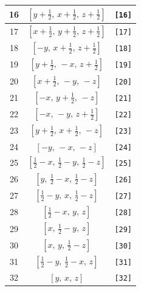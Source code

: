 \documentclass[fleqn,8pt]{jsarticle}
\begin{document}
\begin{longtable}{ccc}
16 & $\left[ y + \frac{1}{2},\, x + \frac{1}{2},\, z + \frac{1}{2} \right]$ & {\tt [16]} \\ \hline
17 & $\left[ x + \frac{1}{2},\, y + \frac{1}{2},\, z + \frac{1}{2} \right]$ & {\tt [17]} \\ \hline
18 & $\left[ - y,\, x + \frac{1}{2},\, z + \frac{1}{2} \right]$ & {\tt [18]} \\ \hline
19 & $\left[ y + \frac{1}{2},\, - x,\, z + \frac{1}{2} \right]$ & {\tt [19]} \\ \hline
20 & $\left[ x + \frac{1}{2},\, - y,\, - z \right]$ & {\tt [20]} \\ \hline
21 & $\left[ - x,\, y + \frac{1}{2},\, - z \right]$ & {\tt [21]} \\ \hline
22 & $\left[ - x,\, - y,\, z + \frac{1}{2} \right]$ & {\tt [22]} \\ \hline
23 & $\left[ y + \frac{1}{2},\, x + \frac{1}{2},\, - z \right]$ & {\tt [23]} \\ \hline
24 & $\left[ - y,\, - x,\, - z \right]$ & {\tt [24]} \\ \hline
25 & $\left[ \frac{1}{2} - x,\, \frac{1}{2} - y,\, \frac{1}{2} - z \right]$ & {\tt [25]} \\ \hline
26 & $\left[ y,\, \frac{1}{2} - x,\, \frac{1}{2} - z \right]$ & {\tt [26]} \\ \hline
27 & $\left[ \frac{1}{2} - y,\, x,\, \frac{1}{2} - z \right]$ & {\tt [27]} \\ \hline
28 & $\left[ \frac{1}{2} - x,\, y,\, z \right]$ & {\tt [28]} \\ \hline
29 & $\left[ x,\, \frac{1}{2} - y,\, z \right]$ & {\tt [29]} \\ \hline
30 & $\left[ x,\, y,\, \frac{1}{2} - z \right]$ & {\tt [30]} \\ \hline
31 & $\left[ \frac{1}{2} - y,\, \frac{1}{2} - x,\, z \right]$ & {\tt [31]} \\ \hline
32 & $\left[ y,\, x,\, z \right]$ & {\tt [32]} \\
\end{longtable}
\end{document}

